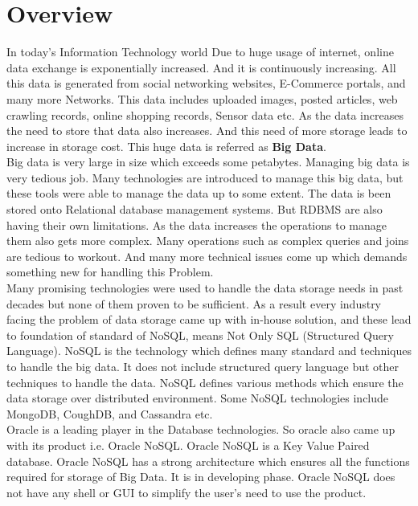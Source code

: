 \section{Overview}
\hspace*{0.7in} In today's Information Technology world Due to huge usage of internet, online data exchange is exponentially increased. And it is continuously increasing. All this data is generated from social networking websites, E-Commerce portals, and many more Networks. This data includes uploaded images, posted articles, web crawling records, online shopping records, Sensor data etc. As the data increases the need to store that data also increases. And this need of more storage leads to increase in storage cost. This huge data is referred as \textbf{Big Data}.
\\
\hspace*{0.7in} Big data is very large in size which exceeds some petabytes. Managing big data is very tedious job. Many technologies are introduced to manage this big data, but these tools were able to manage the data up to some extent. The data is been stored onto Relational database management systems. But RDBMS are also having their own limitations. As the data increases the operations to manage them also gets more complex. Many operations such as complex queries and joins are tedious to workout. And many more technical issues come up which demands something new for handling this Problem.
\\
\hspace*{0.7in} Many promising technologies were used to handle the data storage needs in past decades but none of them proven to be sufficient. As a result every industry facing the problem of data storage came up with in-house solution, and these lead to foundation of standard of NoSQL, means Not Only SQL (Structured Query Language). NoSQL is the technology which defines many standard and techniques to handle the big data. It does not include structured query language but other techniques to handle the data. NoSQL defines various methods which ensure the data storage over distributed environment. Some NoSQL technologies include MongoDB, CoughDB, and Cassandra etc.
\\
\hspace*{0.7in} Oracle is a leading player in the Database technologies. So oracle also came up with its product i.e. Oracle NoSQL. Oracle NoSQL is a Key Value Paired database. Oracle NoSQL has a strong architecture which ensures all the functions required for storage of Big Data. It is in developing phase. Oracle NoSQL does not have any shell or GUI to simplify the user's need to use the product.
